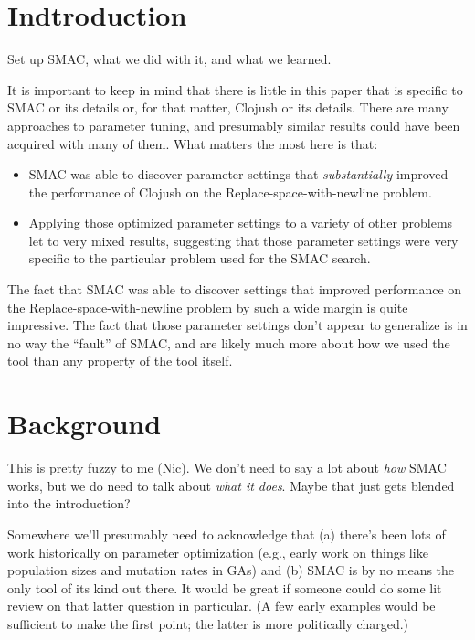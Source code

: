 \documentclass{llncs}
\begin{document}
\section{Indtroduction}

Set up SMAC, what we did with it, and what we learned.

It is important to keep in mind that there is little in this paper that is
specific to SMAC or its details or, for that matter, Clojush or its details. 
There are many approaches to parameter
tuning, and presumably similar results could have been acquired with many of
them. What matters the most here is that:
\begin{itemize}
	\item SMAC was able to discover parameter settings that 
	\emph{substantially} improved the performance
	of Clojush on the Replace-space-with-newline problem.
	\item Applying those optimized parameter settings to a variety of other
	problems let to very mixed results, suggesting that those parameter
	settings were very specific to the particular problem used for the SMAC
	search.
\end{itemize}
The fact that SMAC was able to discover settings that improved
performance on the Replace-space-with-newline problem by such a wide margin
is quite impressive. The fact that those parameter settings don't appear to
generalize is in no way the ``fault'' of SMAC, and are likely much more 
about how we used the tool than any property of the tool itself.

\section{Background}

This is pretty fuzzy to me (Nic). We don't need to say a lot about \emph{how}
SMAC works, but we do need to talk about \emph{what it does}. Maybe that just
gets blended into the introduction?

Somewhere we'll presumably need to acknowledge that (a) there's been lots of
work historically on parameter optimization (e.g., early work on things like
population sizes and mutation rates in GAs) and (b) SMAC is by no means the
only tool of its kind out there. It would be great if someone could do some
lit review on that latter question in particular. (A few early examples would
be sufficient to make the first point; the latter is more politically charged.)
\end{document}
